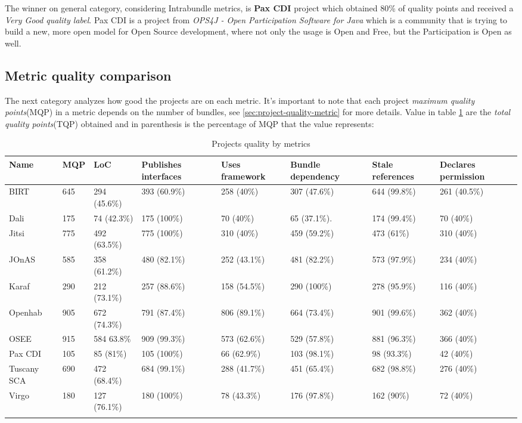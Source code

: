 The winner on general category, considering Intrabundle metrics, is \textbf{Pax CDI} project which obtained 80\% of quality points and received a \emph{Very Good quality label}. Pax CDI is a project from \emph{OPS4J - Open Participation Software for Java} which is a community that is trying to build a new, more open model for Open Source development, where not only the usage is Open and Free, but the Participation is Open as well. 

\subsection{Metric quality comparison}

The next category analyzes how good the projects are on each metric. It's important to note that each project \emph{maximum quality points}(MQP) in a metric depends on the number of bundles, see \ref{sec:project-quality-metric} for more details. Value in table \ref{projects-metrics-quality} are the \emph{total quality points}(TQP) obtained and in parenthesis is the percentage of MQP that the value represents:  

\begin{table}[h]
\tiny
\caption{Projects quality by metrics}
\label{projects-metrics-quality}
    \begin{tabular}{  p{3cm} | p{2cm} | p{2cm} | p{2cm} | p{2cm} | p{2cm} | p{2cm} | p{2cm} }
    \Xhline{2\arrayrulewidth}
    Name & MQP & LoC & Publishes interfaces & Uses framework & Bundle dependency & Stale references & Declares permission \\  \hline
    BIRT & 645 & 294 (45.6\%) & 393 (60.9\%) & 258 (40\%) & 307 (47.6\%) & 644 (99.8\%) & 261 (40.5\%)\\ \hline
    Dali & 175 & 74 (42.3\%) & 175 (100\%) & 70 (40\%) & 65 (37.1\%). & 174 (99.4\%) & 70 (40\%)\\ \hline
    Jitsi & 775 & 492 (63.5\%) & 775 (100\%) & 310 (40\%) & 459 (59.2\%) & 473 (61\%) & 310 (40\%)\\ \hline
    JOnAS & 585 & 358 (61.2\%) & 480 (82.1\%) & 252 (43.1\%) & 481 (82.2\%) & 573 (97.9\%) & 234 (40\%)\\ \hline
    Karaf & 290 & 212 (73.1\%) & 257 (88.6\%) & 158 (54.5\%) &  290 (100\%) & 278 (95.9\%) & 116 (40\%)\\ \hline
    Openhab & 905 & 672 (74.3\%)& 791 (87.4\%) & 806 (89.1\%)&  664 (73.4\%) & 901 (99.6\%) & 362 (40\%)\\ \hline
    OSEE & 915 & 584 63.8\% & 909 (99.3\%) & 573 (62.6\%) & 529 (57.8\%) & 881 (96.3\%) & 366 (40\%)\\ \hline
    Pax CDI & 105 & 85 (81\%) & 105 (100\%) & 66 (62.9\%) & 103 (98.1\%) & 98 (93.3\%) & 42 (40\%) \\ \hline
    Tuscany SCA & 690 & 472 (68.4\%) & 684 (99.1\%) & 288 (41.7\%) & 451 (65.4\%) &  682 (98.8\%) & 276 (40\%) \\ \hline
    Virgo & 180 & 127 (76.1\%) & 180 (100\%) & 78 (43.3\%) & 176 (97.8\%) & 162 (90\%) & 72 (40\%)\\
   \Xhline{2\arrayrulewidth}
    \end{tabular}
\end{table}
\FloatBarrier   

